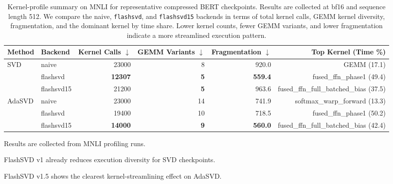 \begin{table}[t]
\centering
\scriptsize
\setlength{\tabcolsep}{9pt}
\renewcommand{\arraystretch}{1.10}
\begin{threeparttable}
\caption{
Kernel-profile summary on MNLI for representative compressed BERT checkpoints.
Results are collected at bf16 and sequence length 512.
We compare the naive, \texttt{flashsvd}, and \texttt{flashsvd15} backends in terms of total kernel calls, GEMM kernel diversity, fragmentation, and the dominant kernel by time share.
Lower kernel counts, fewer GEMM variants, and lower fragmentation indicate a more streamlined execution pattern.
}
\label{tab:kernel_profile_mnli}
\begin{tabular}{llrrrr}
\toprule
Method & Backend & Kernel Calls $\downarrow$ & GEMM Variants $\downarrow$ & Fragmentation $\downarrow$ & Top Kernel (Time \%) \\
\midrule
SVD
& naive      & 23000 & 8  & 920.0 & GEMM (17.1) \\
& flashsvd   & \textbf{12307} & \textbf{5} & \textbf{559.4} & fused\_ffn\_phase1 (49.4) \\
& flashsvd15 & 21200 & \textbf{5} & 963.6 & fused\_ffn\_full\_batched\_bias (37.5) \\
\midrule
AdaSVD
& naive      & 23000 & 14 & 741.9 & softmax\_warp\_forward (13.3) \\
& flashsvd   & 19400 & 10 & 718.5 & fused\_ffn\_phase1 (50.2) \\
& flashsvd15 & \textbf{14000} & \textbf{9} & \textbf{560.0} & fused\_ffn\_full\_batched\_bias (42.4) \\
\bottomrule
\end{tabular}
\begin{tablenotes}[flushleft]
\footnotesize
\item Results are collected from MNLI profiling runs.
\item FlashSVD v1 already reduces execution diversity for SVD checkpoints.
\item FlashSVD v1.5 shows the clearest kernel-streamlining effect on AdaSVD.
\end{tablenotes}
\end{threeparttable}
\end{table}
